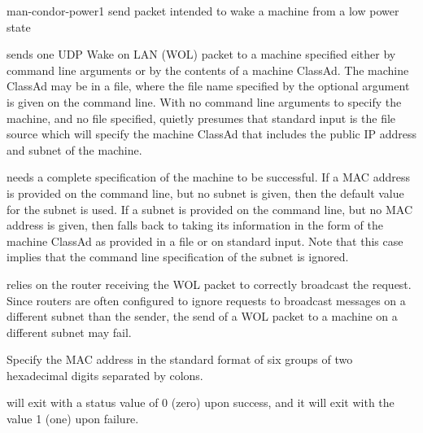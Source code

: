 \begin{ManPage}{}{man-condor-power}{1}
{send packet intended to wake a machine from a low power state}

\Synopsis 
{}



\Description

 sends one UDP Wake on LAN (WOL) packet to a machine
specified either by command line arguments or by the contents
of a machine ClassAd.
The machine ClassAd may be in a file, where the 
file name specified by the optional argument  
is given on the command line.
With no command line arguments to specify the machine,
and no file specified,  quietly presumes that standard input
is the file source which will
specify the machine ClassAd that includes the public IP address
and subnet of the machine.

 needs a complete specification of the machine to
be successful.
If a MAC address is provided on the command line, but no subnet is given,
then the default value for the subnet is used.
If a subnet is provided on the command line, but no MAC address is given,
then  falls back to taking its information in the form
of the machine ClassAd as provided in a file or on standard input.
Note that this case implies that the command line specification of the 
subnet is ignored.

 relies on the router receiving the WOL packet to correctly
broadcast the request. 
Since routers are often configured to ignore
requests to broadcast messages on a different subnet than the sender,
the send of a WOL packet to a machine on a different subnet may fail.

\begin{Options}
   {Specify the MAC address in the standard
    format of six groups of two hexadecimal digits separated by colons. }

\end{Options}

\ExitStatus

 will exit with a status value of 0 (zero) upon success,
and it will exit with the value 1 (one) upon failure.

\end{ManPage}
